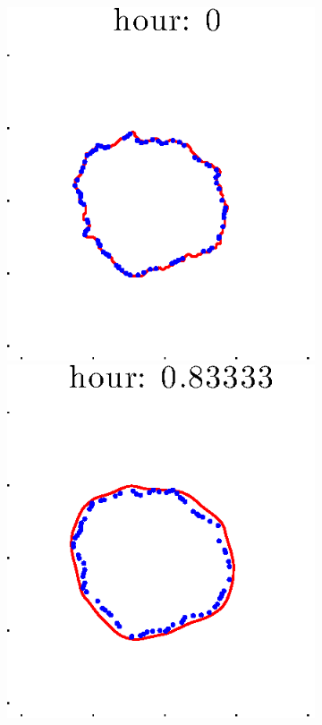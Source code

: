 \documentclass[12pt]{article}
\begin{document}
\begin{figure}[h!]
\begin{subfigure}[b]{.3\textwidth}
	\end{subfigure}
	\begin{subfigure}[b]{.3\textwidth}
	\centering
		\includegraphics[height=.15\textheight]{Pos5exp2/secondhalf/second1.eps}
		\includegraphics[height=.15\textheight]{Pos5exp2/secondhalf/second2.eps}

\end{subfigure}
\end{figure}
\end{document}
